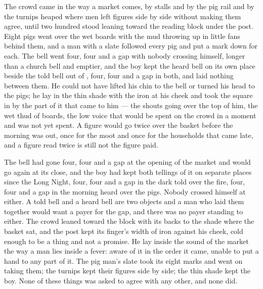 The crowd came in the way a market comes, by stalls and by the pig rail and by the turnips heaped where men left figures side by side without making them agree, until two hundred stood leaning toward the reading block under the post. Eight pigs went over the wet boards with the mud throwing up in little fans behind them, and a man with a slate followed every pig and put a mark down for each. The bell went four, four and a gap with nobody crossing himself, longer than a church bell and emptier, and the boy kept the heard bell on its own place beside the told bell out of , four, four and a gap in both, and laid nothing between them. He could not have lifted his chin to the bell or turned his head to the pigs; he lay in the thin shade with the iron at his cheek and took the square in by the part of it that came to him --- the shouts going over the top of him, the wet thud of boards, the low voice that would be spent on the crowd in a moment and was not yet spent. A figure would go twice over the basket before the morning was out, once for the moot and once for the households that came late, and a figure read twice is still not the figure paid.

The bell had gone four, four and a gap at the opening of the market and would go again at its close, and the boy had kept both tellings of it on separate places since the Long Night, four, four and a gap in the dark told over the fire, four, four and a gap in the morning heard over the pigs. Nobody crossed himself at either. A told bell and a heard bell are two objects and a man who laid them together would want a payer for the gap, and there was no payer standing to either. The crowd leaned toward the block with its backs to the shade where the basket sat, and the post kept its finger's width of iron against his cheek, cold enough to be a thing and not a promise. He lay inside the sound of the market the way a man lies inside a fever: aware of it in the order it came, unable to put a hand to any part of it. The pig man's slate took its eight marks and went on taking them; the turnips kept their figures side by side; the thin shade kept the boy. None of these things was asked to agree with any other, and none did.

\scenebreak

